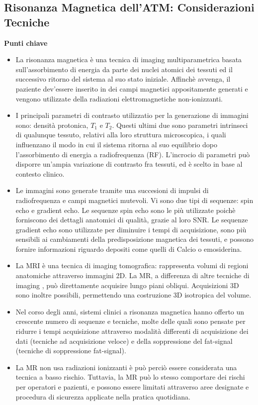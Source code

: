 \documentclass[leqno,10pt,twocolumn,a4paper]{article}
\begin{document}
	\twocolumn
	\begin{flushleft}
		\section{Risonanza Magnetica dell'ATM: Considerazioni Tecniche}
	\end{flushleft}
	\textbf{Punti chiave}\\
	\begin{itemize}
		\item La risonanza magnetica è una tecnica di imaging multiparametrica basata sull'assorbimento di energia da parte dei nuclei atomici dei tessuti ed il successivo ritorno del sistema al suo stato iniziale. Affinchè avvenga, il paziente
		dev'essere inserito in dei campi magnetici appositamente generati e vengono utilizzate della radiazioni elettromagnetiche non-ionizzanti.
		\item I principali parametri di contrasto utilizzatio per la generazione di immagini sono: densità protonica, $T_1$ e $T_2$. Questi ultimi due sono parametri intrinseci di qualunque tessuto, relativi alla loro struttura microscopica, i 
		quali influenzano il modo in cui il sistema ritorna al suo equilibrio dopo l'assorbimento di energia a radiofrequenza (RF). L'incrocio di parametri può disporre un'ampia variazione di contrasto fra tessuti, ed è scelto in base al contesto 
		clinico.
		\item Le immagini sono generate tramite una succesioni di impulsi di radiofrequenza e campi magnetici mutevoli. Vi sono due tipi di sequenze: spin echo e gradient echo. Le sequenze spin echo sono le più utilizzate poichè forniscono
		dei dettagli anatomici di qualità, grazie al loro SNR. Le sequenze gradient echo sono utilizzate per diminuire i tempi di acquisizione, sono più sensibili ai cambiamenti della predisposizione magnetica dei tessuti, e possono fornire 
		informazioni riguardo depositi come quelli di Calcio o emosiderina.
		\item La MRI è una tecnica di imaging tomografica: rappresenta volumi di regioni anatomiche attraverso immagini 2D. La MR, a differenza di altre tecniche di imaging , può direttamente acquisire lungo piani obliqui. Acquisizioni
		3D sono inoltre possibili, permettendo una costruzione 3D isotropica del volume.
		\item Nel corso degli anni, sistemi clinici a risonanza magnetica hanno offerto un crescente numero di sequenze e tecniche, molte delle quali sono pensate per ridurre i tempi acquisizione attraverso modalità differenti di 
		acquisizione dei dati (tecniche ad acquisizione veloce) e della soppressione del fat-signal (tecniche di soppressione fat-signal).
		\item La MR non usa radiazioni ionizzanti è può perciò essere considerata una tecnica a basso rischio. Tuttavia, la MR può lo stesso comportare dei rischi per operatori e pazienti, e possono essere limitati attraverso aree designate
		e procedura di sicurezza applicate nella pratica quotidiana.
	\end{itemize}
\end{document}
